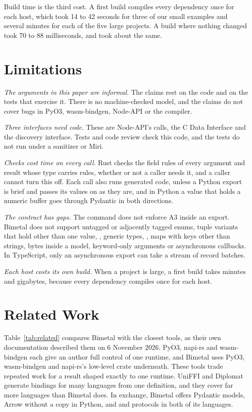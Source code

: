 \documentclass[sigconf,nonacm]{acmart}
\begin{document}
Build time is the third cost. A first build compiles every dependency once for each host, which took 14 to 42 seconds for three of our small examples and several minutes for each of the five large projects. A build where nothing changed took 70 to 88 milliseconds, and  took about the same.

\section{Limitations}
\label{sec:limitations}

\emph{The arguments in this paper are informal.} The claims rest on the code and on the tests that exercise it. There is no machine-checked model, and the claims do not cover bugs in PyO3, wasm-bindgen, Node-API or the compiler.

\emph{Three interfaces need  code.} These are Node-API's calls, the C Data Interface and the discovery interface. Tests and code review check this code, and the tests do not run under a sanitizer or Miri.

\emph{Checks cost time on every call.} Rust checks the field rules of every argument and result whose type carries rules, whether or not a caller needs it, and a caller cannot turn this off. Each call also runs generated code, unless a Python export is brief and passes its values on as they are, and in Python a value that holds a numeric buffer goes through Pydantic in both directions.

\emph{The contract has gaps.} The command does not enforce A3 inside an export. Bimetal does not support untagged or adjacently tagged enums, tuple variants that hold other than one value, , generic types, , maps with keys other than strings, bytes inside a model, keyword-only arguments or asynchronous callbacks. In TypeScript, only an asynchronous export can take a stream of record batches.

\emph{Each host costs its own build.} When a project is large, a first build takes minutes and gigabytes, because every dependency compiles once for each host.

\section{Related Work}
\label{sec:related}

Table~\ref{tab:related} compares Bimetal with the closest tools, as their own documentation described them on 6 November 2026. PyO3, napi-rs and wasm-bindgen each give an author full control of one runtime, and Bimetal uses PyO3, wasm-bindgen and napi-rs's low-level  crate underneath. These tools trade repeated work for a result shaped exactly to one runtime. UniFFI and Diplomat generate bindings for many languages from one definition, and they cover far more languages than Bimetal does. In exchange, Bimetal offers Pydantic models, Arrow without a copy in Python, and  and protocols in both of its languages.
\end{document}
